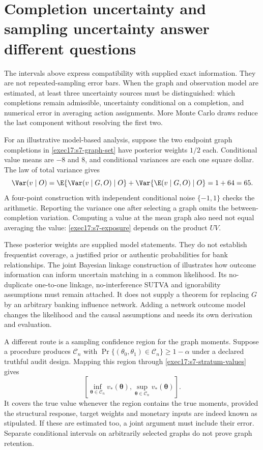 \section{Completion uncertainty and sampling uncertainty answer different questions}
\label{exec17:s7-uncertainty}

The intervals above express compatibility with supplied exact information.
They are not repeated-sampling error bars. When the graph and observation
model are estimated, at least three uncertainty sources must be distinguished:
which completions remain admissible, uncertainty conditional on a completion,
and numerical error in averaging action assignments. More Monte Carlo draws
reduce the last component without resolving the first two.

For an illustrative model-based analysis, suppose the two endpoint graph
completions in \eqref{exec17:s7-graph-set} have posterior weights $1/2$ each.
Conditional value means are $-8$ and $8$, and conditional variances are each
one square dollar. The law of total variance gives
\begin{equation}
 \Var(v\mid O)=
 \E\{\Var(v\mid G,O)\mid O\}
 +\Var\{\E(v\mid G,O)\mid O\}=1+64=65.
 \label{exec17:s7-total-variance}
\end{equation}
A four-point construction with independent conditional noise $\{-1,1\}$
checks the arithmetic. Reporting the variance one after selecting a graph
omits the between-completion variation. Computing a value at the mean graph
also need not equal averaging the value: \eqref{exec17:s7-exposure} depends
on the product $UV$.~\citep{exec17_s7_math}

These posterior weights are supplied model statements. They do not establish
frequentist coverage, a justified prior or authentic probabilities for bank
relationships. The joint Bayesian linkage construction of \citet{guha2022}
illustrates how outcome information can inform uncertain matching in a common
likelihood. Its no-duplicate one-to-one linkage, no-interference SUTVA and
ignorability assumptions must remain attached. It does not supply a theorem
for replacing $G$ by an arbitrary banking influence network. Adding a network
outcome model changes the likelihood and the causal assumptions and needs its
own derivation and evaluation.

A different route is a sampling confidence region for the graph moments.
Suppose a procedure produces $\mathcal C_n$ with
$\Pr\{(\theta_0,\theta_1)\in\mathcal C_n\}\geq1-\alpha$ under a declared
truthful audit design. Mapping this region through
\eqref{exec17:s7-stratum-values} gives
\begin{equation}
 \left[\inf_{\boldsymbol\theta\in\mathcal C_n}v_*(\boldsymbol\theta),
       \sup_{\boldsymbol\theta\in\mathcal C_n}v_*(\boldsymbol\theta)\right].
 \label{exec17:s7-region-image}
\end{equation}
It covers the true value whenever the region contains the true moments,
provided the structural response, target weights and monetary inputs are
indeed known as stipulated. If these are estimated too, a joint argument
must include their error. Separate conditional intervals on arbitrarily
selected graphs do not prove graph retention.

